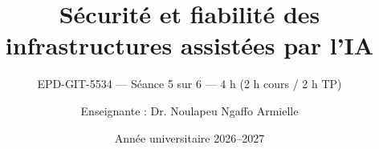 
\title[EPD-GIT-5534 --- Séance 5]{Sécurité et fiabilité des infrastructures assistées par l'IA}
\subtitle{EPD-GIT-5534 --- Séance 5 sur 6 --- 4 h (2 h cours / 2 h TP)}
\author{Enseignante : Dr. Noulapeu Ngaffo Armielle}
\date{Année universitaire 2026--2027}







